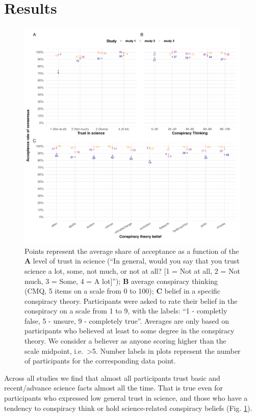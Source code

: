\documentclass[
  doc,floatsintext]{apa6}
\begin{document}
\section{Results}\label{results}



\begin{figure}
\centering
\includegraphics{output/figures/summary-plot.pdf}
\caption{\label{fig:summary-plot}Points represent the average share of acceptance as a function of the \textbf{A} level of trust in science (``In general, would you say that you trust science a lot, some, not much, or not at all? {[}1 = Not at all, 2 = Not much, 3 = Some, 4 = A lot{]}''); \textbf{B} average conspiracy thinking (CMQ, 5 items on a scale from 0 to 100); \textbf{C} belief in a specific conspiracy theory. Participants were asked to rate their belief in the conspiracy on a scale from 1 to 9, with the labels: ``1 - completly false, 5 - unsure, 9 - completely true''. Averages are only based on participants who believed at least to some degree in the conspiracy theory. We consider a believer as anyone scoring higher than the scale midpoint, i.e.~\textgreater5. Number labels in plots represent the number of participants for the corresponding data point.}
\end{figure}

Across all studies we find that almost all participants trust basic and recent/advance science facts almost all the time. That is true even for participants who expressed low general trust in science, and those who have a tendency to conspiracy think or hold science-related conspiracy beliefs (Fig. \ref{fig:summary-plot}).
\end{document}
